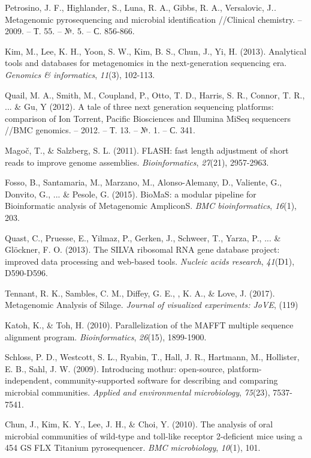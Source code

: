\documentclass[a4paper,12pt,openany,final]{extreport}
\begin{document}
Petrosino, J. F., Highlander, S., Luna, R. A., Gibbs, R. A., Versalovic,
J.\emph{.} Metagenomic pyrosequencing and microbial identification
//Clinical chemistry. -- 2009. -- Т. 55. -- №. 5. -- С. 856-866.

Kim, M., Lee, K. H., Yoon, S. W., Kim, B. S., Chun, J., Yi, H. (2013).
Analytical tools and databases for metagenomics in the next-generation
sequencing era. \emph{Genomics \& informatics}, \emph{11}(3), 102-113.

Quail, M. A., Smith, M., Coupland, P., Otto, T. D., Harris, S. R.,
Connor, T. R., ... \& Gu, Y (2012)\emph{.} A tale of three next
generation sequencing platforms: comparison of Ion Torrent, Pacific
Biosciences and Illumina MiSeq sequencers //BMC genomics. -- 2012. -- Т.
13. -- №. 1. -- С. 341.

Magoč, T., \& Salzberg, S. L. (2011). FLASH: fast length adjustment of
short reads to improve genome assemblies. \emph{Bioinformatics},
\emph{27}(21), 2957-2963.

Fosso, B., Santamaria, M., Marzano, M., Alonso-Alemany, D., Valiente,
G., Donvito, G., ... \& Pesole, G. (2015). BioMaS: a modular pipeline
for Bioinformatic analysis of Metagenomic AmpliconS. \emph{BMC
bioinformatics}, \emph{16}(1), 203.

Quast, C., Pruesse, E., Yilmaz, P., Gerken, J., Schweer, T., Yarza, P.,
... \& Glöckner, F. O. (2013). The SILVA ribosomal RNA gene database
project: improved data processing and web-based tools. \emph{Nucleic
acids research}, \emph{41}(D1), D590-D596.

Tennant, R. K., Sambles, C. M., Diffey, G. E., , K. A., \& Love, J.
(2017). Metagenomic Analysis of Silage. \emph{Journal of visualized
experiments: JoVE}, (119)

Katoh, K., \& Toh, H. (2010). Parallelization of the MAFFT multiple
sequence alignment program. \emph{Bioinformatics}, \emph{26}(15),
1899-1900.

Schloss, P. D., Westcott, S. L., Ryabin, T., Hall, J. R., Hartmann, M.,
Hollister, E. B., Sahl, J. W. (2009). Introducing mothur: open-source,
platform-independent, community-supported software for describing and
comparing microbial communities. \emph{Applied and environmental
microbiology}, \emph{75}(23), 7537-7541.

Chun, J., Kim, K. Y., Lee, J. H., \& Choi, Y. (2010). The analysis of
oral microbial communities of wild-type and toll-like receptor
2-deficient mice using a 454 GS FLX Titanium pyrosequencer. \emph{BMC
microbiology}, \emph{10}(1), 101.
\end{document}
